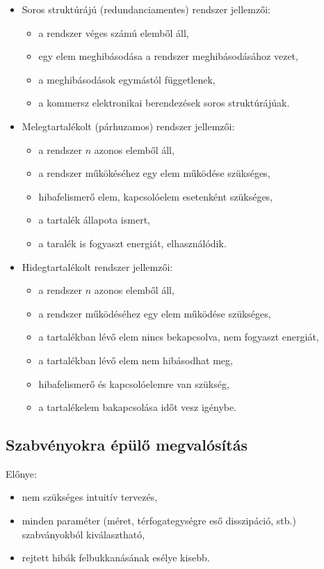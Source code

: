 \documentclass[11pt]{article}
\begin{document}
			\begin{itemize}
				\item Soros struktúrájú (redundanciamentes) rendszer jellemzői: 
				\begin{itemize}
					\item a rendszer véges számú elemből áll, 
					\item egy elem meghibásodása a rendszer meghibásodásához vezet,
					\item a meghibásodások egymástól függetlenek, 
					\item a kommersz elektronikai berendezések soros struktúrájúak.
				\end{itemize}
				\item Melegtartalékolt (párhuzamos) rendszer jellemzői:
				\begin{itemize}
					\item a rendszer $n$ azonos elemből áll,
					\item a rendszer műkökéséhez egy elem működése szükséges, 
					\item hibafelismerő elem, kapcsolóelem esetenként szükséges,
					\item a tartalék állapota ismert, 
					\item a taralék is fogyaszt energiát, elhasználódik.
				\end{itemize}
				\item Hidegtartalékolt rendszer jellemzői:
				\begin{itemize}
					\item a rendszer $n$ azonos elemből áll, 
					\item a rendszer működéséhez egy elem működése szükséges, 
					\item a tartalékban lévő elem nincs bekapcsolva, nem fogyaszt energiát,
					\item a tartalékban lévő elem nem hibásodhat meg,
					\item hibafelismerő és kapcsolóelemre van szükség,
					\item a tartalékelem bakapcsolása időt vesz igénybe.
				\end{itemize}
			\end{itemize}

		\subsection{Szabvényokra épülő megvalósítás}

			Előnye:

			\begin{itemize}
				\item nem szükséges intuitív tervezés, 
				\item minden paraméter (méret, térfogategységre eső disszipáció, stb.) szabványokból kiválasztható,
				\item rejtett hibák felbukkanásának esélye kisebb.
			\end{itemize}
\end{document}
